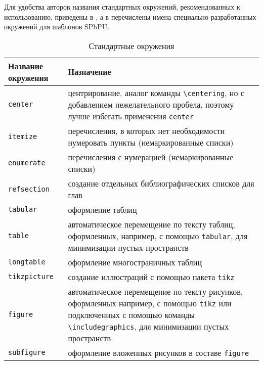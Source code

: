 Для удобства авторов названия стандартных окружений, рекомендованных к использованию, приведены в , а в   перечислены имена специально разработанных окружений для шаблонов SPbPU.





	\begin{table} [htbp]%
	\centering\small
	\caption{Стандартные окружения}%
	\label{tab:enum-std}
	 \begin{Spacing}{\Single} %
	  \renewcommand*{\arraystretch}{1.5} %
		\begin{tabular}{|l|p{11cm}|} 
			\hline
			Название окружения&Назначение\\
			\hline
			\verb|center| &	центрирование, аналог команды \verb|\centering|, но с добавлением нежелательного пробела, поэтому лучше избегать применения \verb|center|\\ \hline
			\verb|itemize| &{перечисления, в которых нет необходимости нумеровать  пункты (немаркированные списки)} \\ \hline
			\verb|enumerate| & перечисления с нумерацией (немаркированные списки) \\ \hline
			\verb|refsection| & создание отдельных библиографических списков для глав \\ \hline
			\verb|tabular| & оформление таблиц \\ \hline
			\verb|table|   &{автоматическое перемещение по тексту таблиц, оформленных, например, с помощью \verb|tabular|, для минимизации пустых пространств} \\ \hline
			\verb|longtable| & оформление многостраничных таблиц \\ \hline
			\verb|tikzpicture| & создание иллюстраций с помощью пакета \verb|tikz| \cite{ctan-tikz} \\ \hline
			\verb|figure| &{автоматическое перемещение по тексту рисунков, оформленных например, с помощью \verb|tikz| или подключенных с помощью команды \verb|\includegraphics|, для минимизации пустых пространств} \\ \hline 
			\verb|subfigure| & оформление вложенных рисунков в составе \verb|figure| \\ \hline

\end{tabular}
\end{Spacing}
\end{table}
